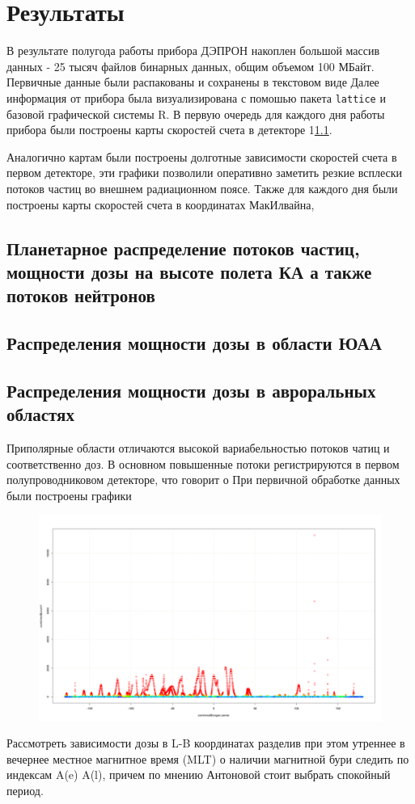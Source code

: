 
\chapter{Результаты}\label{chapt_results}
В результате полугода работы прибора ДЭПРОН накоплен большой массив данных - 25 тысяч файлов бинарных данных, общим объемом 100 МБайт. Первичные данные были распакованы и сохранены в текстовом виде 
Далее информация от прибора была визуализирована с помошью пакета \texttt{lattice} и базовой графической системы R. 
В первую очередь для каждого дня работы прибора были построены карты скоростей счета в детекторе 1\ref{sec:planetDose}.

Аналогично картам были построены долготные зависимости скоростей счета в первом детекторе, эти графики позволили оперативно заметить резкие всплески потоков частиц во внешнем радиационном поясе. Также для каждого дня были построены карты скоростей счета в координатах МакИлвайна, 

\section{Планетарное распределение потоков частиц, мощности дозы на высоте полета КА а также потоков нейтронов} \label{sec:planetDose}


\section{Распределения мощности дозы в области ЮАА}

\section{Распределения мощности дозы в авроральных областях}
Приполярные области отличаются высокой вариабельностью потоков чатиц и соответственно доз. В основном повышенные потоки регистрируются в первом полупроводниковом детекторе, что говорит о 
При первичной обработке данных были построены графики 
\begin{figure}[h]
	\includegraphics[width=0.8\linewidth]{images/Flash/depron_lat_map_148}
	\caption[Потокизаряженных частиц в детекторе 1]{}
	\caption{}
	\label{fig:depronlatmap148}
\end{figure}
Рассмотреть зависимости дозы в L-B координатах разделив при этом утреннее в вечернее местное магнитное время (MLT) о наличии магнитной бури следить по индексам A(e) A(l), причем по мнению Антоновой стоит выбрать спокойный период.

